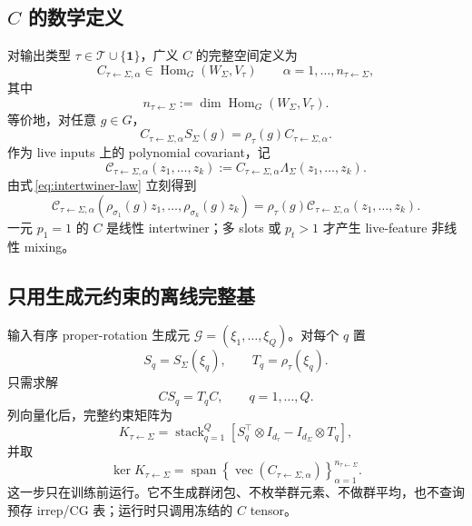 \documentclass[11pt,a4paper,fontset=fandol]{ctexart}
\newcommand{\Hom}{\operatorname{Hom}}
\newcommand{\one}{\mathbf 1}
\begin{document}
\subsection{$C$ 的数学定义}

对输出类型 $\tau\in\mathscr T\cup\{\one\}$，广义 $C$ 的完整空间定义为
\begin{equation}
  \boxed{
  C_{\tau\leftarrow\Sigma,\alpha}
  \in \Hom_G(W_\Sigma,V_\tau)
  }
  \qquad
  \alpha=1,\ldots,n_{\tau\leftarrow\Sigma},
  \label{eq:c-hom}
\end{equation}
其中
\begin{equation}
  n_{\tau\leftarrow\Sigma}
  :=\dim\Hom_G(W_\Sigma,V_\tau).
\end{equation}
等价地，对任意 $g\in G$，
\begin{equation}
  C_{\tau\leftarrow\Sigma,\alpha}S_\Sigma(g)
  =\rho_\tau(g)C_{\tau\leftarrow\Sigma,\alpha}.
  \label{eq:intertwiner-law}
\end{equation}
作为 live inputs 上的 polynomial covariant，记
\begin{equation}
  \mathcal C_{\tau\leftarrow\Sigma,\alpha}(z_1,\ldots,z_k)
  :=C_{\tau\leftarrow\Sigma,\alpha}\Lambda_\Sigma(z_1,\ldots,z_k).
  \label{eq:c-eval}
\end{equation}
由式\,\eqref{eq:intertwiner-law} 立刻得到
\begin{equation}
  \mathcal C_{\tau\leftarrow\Sigma,\alpha}
  (\rho_{\sigma_1}(g)z_1,\ldots,\rho_{\sigma_k}(g)z_k)
  =\rho_\tau(g)\mathcal C_{\tau\leftarrow\Sigma,\alpha}(z_1,\ldots,z_k).
  \label{eq:c-covariance}
\end{equation}
一元 $p_1=1$ 的 $C$ 是线性 intertwiner；多 slots 或 $p_t>1$ 才产生 live-feature 非线性 mixing。

\subsection{只用生成元约束的离线完整基}

输入有序 proper-rotation 生成元 $\mathcal G=(\xi_1,\ldots,\xi_Q)$。对每个 $q$ 置
\begin{equation}
  S_q=S_\Sigma(\xi_q),
  \qquad T_q=\rho_\tau(\xi_q).
\end{equation}
只需求解
\begin{equation}
  CS_q=T_qC,
  \qquad q=1,\ldots,Q.
  \label{eq:generator-constraint}
\end{equation}
列向量化后，完整约束矩阵为
\begin{equation}
  K_{\tau\leftarrow\Sigma}
  =\operatorname{stack}_{q=1}^{Q}
  \left[S_q^\top\otimes I_{d_\tau}-I_{d_\Sigma}\otimes T_q\right],
  \label{eq:null-matrix}
\end{equation}
并取
\begin{equation}
  \ker K_{\tau\leftarrow\Sigma}
  =\operatorname{span}
  \left\{\operatorname{vec}(C_{\tau\leftarrow\Sigma,\alpha})
  \right\}_{\alpha=1}^{n_{\tau\leftarrow\Sigma}}.
  \label{eq:null-basis}
\end{equation}
这一步只在训练前运行。它不生成群闭包、不枚举群元素、不做群平均，也不查询预存 irrep/CG 表；运行时只调用冻结的 $C$ tensor。
\end{document}
